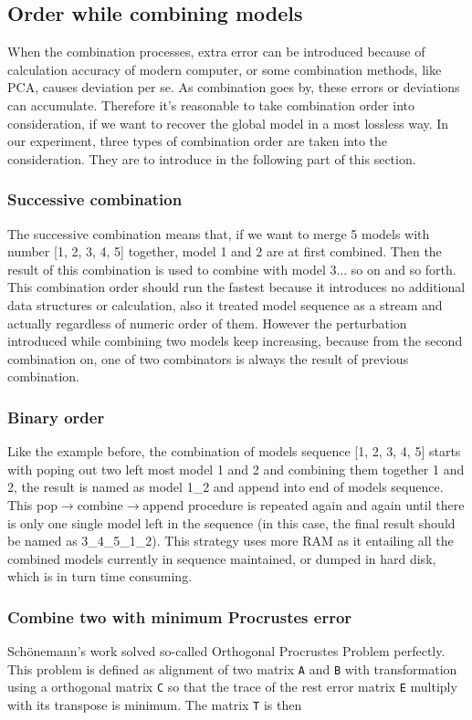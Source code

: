 \subsection{Order while combining models}
When the combination processes, extra error can be introduced because of calculation accuracy of modern computer, or some combination methods, like PCA, causes deviation per se. As combination goes by, these errors or deviations can accumulate. Therefore it's reasonable to take combination order into consideration, if we want to recover the global model in a most lossless way. In our experiment, three types of combination order are taken into the consideration. They are to introduce in the following part of this section.
	
	\subsubsection{Successive combination}
	The successive combination means that, if we want to merge 5 models with number [1, 2, 3, 4, 5] together, model 1 and 2 are at first combined. Then the result of this combination is used to combine with model 3... so on and so forth. This combination order should run the fastest because it introduces no additional data structures or calculation, also it treated model sequence as a stream and actually regardless of numeric order of them. However the perturbation introduced while combining two models keep increasing, because from the second combination on, one of two combinators is always the result of previous combination.

	\subsubsection{Binary order}
	Like the example before, the combination of models sequence [1, 2, 3, 4, 5] starts with poping out two left most model 1 and 2 and combining them together 1 and 2, the result is named as model 1\_2 and append into end of models sequence. This pop$\rightarrow$combine$\rightarrow$append procedure is repeated again and again until there is only one single model left in the sequence (in this case, the final result should be named as 3\_4\_5\_1\_2). This strategy uses more RAM as it entailing all the combined models currently in sequence maintained, or dumped in hard disk, which is in turn time consuming.

	\subsubsection{Combine two with minimum Procrustes error}
	Sch{\"o}nemann's work \cite{schonemann1966generalized} solved so-called Orthogonal Procrustes Problem perfectly. This problem is defined as alignment of two matrix \verb|A| and \verb|B| with transformation using a orthogonal matrix \verb|C| so that the trace of the rest error matrix \verb|E| multiply with its transpose is minimum. The matrix \verb|T| is then

